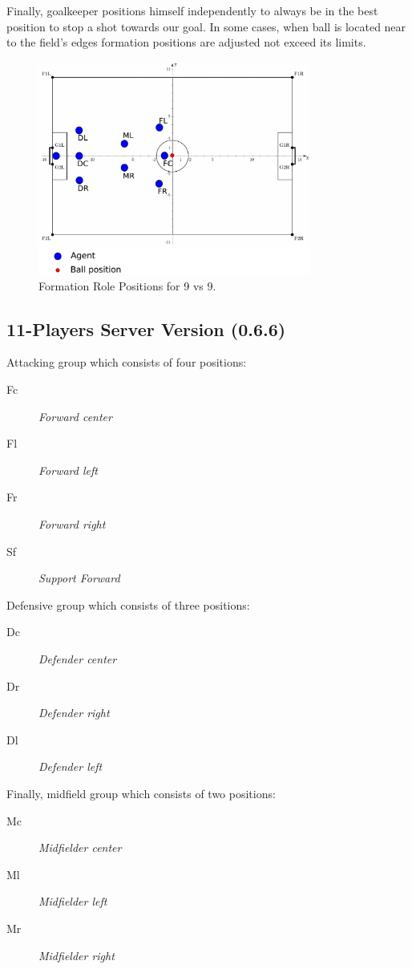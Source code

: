 Finally, goalkeeper positions himself independently to always be in the best position to stop a shot towards our goal. In some cases, when ball is located near to the field's edges formation positions are adjusted not exceed its limits.


\begin{figure}[t!]
\centering
  \includegraphics[width=0.8\textwidth]{Chapter4/figures/Formation9_0.pdf}
  \caption{Formation Role Positions for 9 vs 9.} 
  \label{fig:Formation9_0}
\end{figure}

\subsection{11-Players Server Version (0.6.6)}
Attacking group which consists of four positions:
\begin{description}
\item[Fc] \textit{Forward center}
\item[Fl] \textit{Forward left}
\item[Fr] \textit{Forward right}
\item[Sf] \textit{Support Forward}
\end{description}
Defensive group which consists of three positions:
\begin{description}
\item[Dc] \textit{Defender center}
\item[Dr] \textit{Defender right }
\item[Dl] \textit{Defender left}
\end{description}
Finally, midfield group which consists of two positions:
\begin{description}
\item[Mc] \textit{Midfielder center}
\item[Ml] \textit{Midfielder left}
\item[Mr] \textit{Midfielder right}
\end{description}

